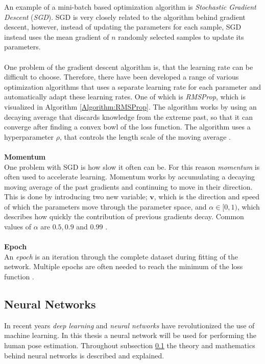 \documentclass[./main.tex]{subfiles}
\begin{document}
\newline
An example of a mini-batch based optimization algorithm is \textit{Stochastic Gradient Descent} (\textit{SGD}). SGD is very closely related to the algorithm behind gradient descent, however, instead of updating the parameters for each sample, SGD instead uses the mean gradient of $n$ randomly selected samples to update its parameters.
\\
\\
\noindent One problem of the gradient descent algorithm is, that the learning rate can be difficult to choose. Therefore, there have been developed a range of various optimization algorithms that uses a separate learning rate for each parameter and automatically adapt these learning rates. One of which is \textit{RMSProp}, which is visualized in Algorithm \ref{Algorithm:RMSProp}. The algorithm works by using an decaying average that discards knowledge from the extreme past, so that it can converge after finding a convex bowl of the loss function. The algorithm uses a hyperparameter $\rho$, that controls the length scale of the moving average \cite{DeepLearning}.
\\
\\
\textbf{Momentum} \\
One problem with SGD is how slow it often can be. For this reason \textit{momentum} is often used to accelerate learning. Momentum works by accumulating a decaying moving average of the past gradients and continuing to move in their direction. This is done by introducing two new variable; $\bm{v}$, which is the direction and speed of which the parameters move through the parameter space, and $\alpha \in [0, 1)$, which describes how quickly the contribution of previous gradients decay. Common values of $\alpha$ are $0.5, 0.9$ and $0.99$ \cite{DeepLearning}. 
\\
\\
\textbf{Epoch} \\
An \textit{epoch} is an iteration through the complete dataset during fitting of the network. Multiple epochs are often needed to reach the minimum of the loss function \cite{d2l}.

\subsection{Neural Networks} \label{subsec:NeuralNetworks}
In recent years \textit{deep learning} and \textit{neural networks} have revolutionized the use of machine learning. In this thesis a neural network will be used for performing the human pose estimation. Throughout subsection \ref{subsec:NeuralNetworks} the theory and mathematics behind neural networks is described and explained.
\end{document}
